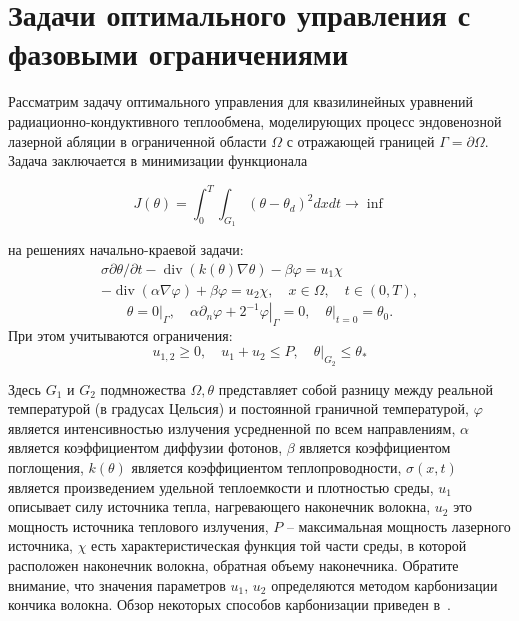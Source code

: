\section{Задачи оптимального управления с фазовыми ограничениями}
\label{sec:ch3:sec2}
%
Рассматрим задачу оптимального
управления для квазилинейных уравнений радиационно-кондуктивного
теплообмена, моделирующих процесс эндовенозной
лазерной абляции в ограниченной области $\Omega$ с отражающей границей $\Gamma=\partial\Omega$.
Задача заключается в минимизации функционала

\[ J(\theta)=\int_{0}^{T} \int_{G_{1}}\left(\theta-\theta_{d}\right)^{2} dx dt \rightarrow \inf \]

на решениях начально-краевой задачи:
\begin{equation}
    \label{eq:3_2:1}
    \begin{gathered}
        \sigma \partial \theta / \partial t-\operatorname{div}(k(\theta)
        \nabla \theta)-\beta \varphi=u_{1} \chi \\
        -\operatorname{div}(\alpha \nabla \varphi)+\beta \varphi=u_{2}
        \chi, \quad x \in \Omega, \quad t \in(0, T),
    \end{gathered}
\end{equation}
\begin{equation}
    \label{eq:3_2:2}
    \theta=\left.0\right|_{\Gamma},
    \quad \alpha \partial_{n} \varphi
    +\left.2^{-1} \varphi\right|_{\Gamma}=0,
    \left.\quad \theta\right|_{t=0}=\theta_{0}.
\end{equation}
При этом учитываются ограничения:
\[ u_{1,2} \geq 0, \quad u_{1}+u_{2} \leq P, \left.\quad \theta\right|_{G_{2}} \leq \theta_{*} \]

Здесь $G_{1}$ и $G_{2}$ подмножества $\Omega, \theta$
представляет собой разницу между реальной температурой
(в градусах Цельсия) и постоянной граничной температурой,
$\varphi$ является интенсивностью излучения усредненной по всем направлениям, $\alpha$
является коэффициентом диффузии фотонов, $\beta$ является коэффициентом поглощения,
$k(\theta)$ является коэффициентом теплопроводности, $\sigma(x, t)$
является произведением удельной теплоемкости и плотностью среды, $u_{1}$
описывает силу источника тепла, нагревающего наконечник волокна, $u_{2}$
это мощность источника теплового излучения,
$P$ -- максимальная мощность лазерного источника,
$\chi$ есть характеристическая функция той части среды,
в которой расположен наконечник волокна,
обратная объему наконечника.
Обратите внимание, что значения параметров $u_{1}$, $u_{2}$
определяются методом карбонизации кончика волокна.
Обзор некоторых способов карбонизации приведен в~\cite{Optimal_Kovtanyuk2020}.

